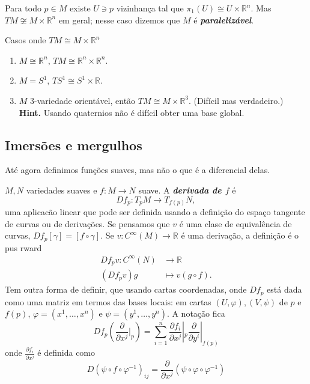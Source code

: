 \begin{remark}\leavevmode
	Para todo \(p \in M\) existe \(U \ni p\) vizinhança tal que \(\pi_1(U) \cong U \times \mathbb{R}^n\). {\color{2}Mas \(TM \not\cong M \times \mathbb{R}^n\) em geral}; nesse caso dizemos que \(M\) é \textit{\textbf{paralelizável}}.
\end{remark}

\begin{thing6}{Casos onde \(TM \cong M \times \mathbb{R}^n\)}\leavevmode
\begin{enumerate}
\item \(M \cong \mathbb{R}^n\), \(TM \cong \mathbb{R}^n \times \mathbb{R}^n\).
\item  \(M= S^1\), \(TS^1 \cong S^1 \times \mathbb{R}\).
\item  \(M\) 3-variedade orientável, então \(TM \cong M \times \mathbb{R}^3\). (Difícil mas verdadeiro.) \textbf{Hint.} Usando quaternios não é difícil obter uma base global.
\end{enumerate}
\end{thing6}

\subsection{Imersões e mergulhos}

Até agora definimos funções suaves, mas não o que é a diferencial delas.

\begin{defn}\leavevmode
	\(M,N\) variedades suaves e \(f:M \to N\) suave. A \textit{\textbf{derivada de $f$}} é
	\[Df_p:T_pM \to T_{f(p)}N,\]
uma aplicacão linear que pode ser definida usando a definição do espaço tangente de curvas ou de derivações. Se pensamos que \(v\) é uma clase de equivalência de curvas,
\(Df_p[\gamma]=[f \circ \gamma].\)
Se \(v: C^\infty(M) \to \mathbb{R}\) é uma derivação, a definição é o pus
rward
\begin{align*}
	Df_pv: C^\infty(N) &\longrightarrow \mathbb{R} \\
	(Df_pv)g &\longmapsto v(g \circ f).
\end{align*}
Tem outra forma de definir, que usando cartas coordenadas, onde \(Df_p\) está dada como uma matriz em termos das bases locais: em cartas \((U,\varphi),(V,\psi)\) de \(p\) e \(f(p)\), \(\varphi=(x^1,\ldots,x^n)\) e \(\psi=(y^1,\ldots,y^n)\). A notação fica
\[Df_p\left(\frac{\partial }{\partial x^j}|_{p}\right) =\sum_{i=1}^n\frac{\partial f_i}{\partial x^j}|_{p}\frac{\partial }{\partial y^i}|_{f(p)}\]
onde \(\frac{\partial f_i}{\partial x^j}\) é definida como
\[D(\psi \circ f \circ \varphi^{-1})_{ij}=\frac{\partial }{\partial x^j}(\psi \circ \varphi \circ \varphi^{-1})\]
\end{defn}


